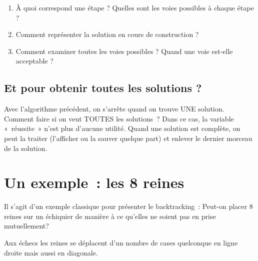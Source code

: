 		\begin{enumerate}
			\item {
				À quoi correspond une étape ? 
				Quelles sont les voies possibles à chaque étape ?}
			\item {
				Comment représenter la solution en cours de construction ?}
			\item {
				Comment examiner toutes les voies possibles ? 
				Quand une voie est-elle acceptable ?}
		\end{enumerate}

	\subsection{Et pour obtenir toutes les solutions ?}

		Avec l'algorithme précédent, on s'arrête quand on trouve UNE solution. 
		Comment faire si on veut TOUTES les solutions~? 
		Dans ce cas, la variable «~réussite~» n'est plus d'aucune utilité. 
		Quand une solution est complète, on peut la traiter (l'afficher ou 
		la sauver quelque part) et enlever le dernier morceau de la solution.



\section{Un exemple~: les 8 reines}

	Il s'agit d'un exemple classique pour présenter le backtracking~: 
	Peut-on placer 8 reines sur un échiquier de  manière à ce qu'elles 
	ne soient pas en prise mutuellement?

	Aux échecs les reines se déplacent d'un nombre de 
	cases quelconque en ligne droite mais aussi en diagonale.

